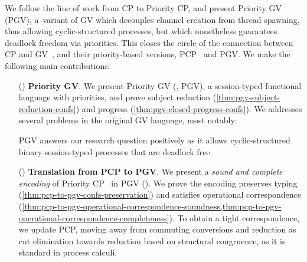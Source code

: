 \documentclass[main.tex]{subfiles}
\begin{document}
We follow the line of work from CP to Priority CP, and present Priority GV (PGV), a~variant of GV which decouples channel creation from thread spawning, thus allowing cyclic-structured processes, but which nonetheless guarantees deadlock freedom via priorities. This closes the circle of the connection between CP and GV~\cite{wadler14}, and their priority-based versions, PCP~\cite{dardhagay18extended} and PGV.
We make the following main contributions:
\begin{enumerate}[labelindent=0pt,labelwidth=1.333\parindent,align=left,labelsep*=0pt,leftmargin=!]
\item[(\secref{sec:pgv})] \textbf{Priority GV}. We present Priority GV (, PGV), a session-typed functional language with priorities, and prove subject reduction (\cref{thm:pgv-subject-reduction-confs}) and progress (\cref{thm:pgv-closed-progress-confs}). We addresses several problems in the original GV language, most notably:
  PGV answers our research question positively as it allows cyclic-structured binary session-typed processes that are deadlock free.
\item[(\secref{sec:pcp})] \textbf{Translation from PCP to PGV}.
  We present a \emph{sound and complete encoding} of Priority CP~\cite{dardhagay18extended} in PGV (). We prove the encoding preserves typing (\cref{thm:pcp-to-pgv-confs-preservation}) and satisfies operational correspondence (\cref{thm:pcp-to-pgv-operational-correspondence-soundness,thm:pcp-to-pgv-operational-correspondence-completeness}).
  To obtain a tight correspondence, we update PCP, moving away from commuting conversions and reduction as cut elimination towards reduction based on structural congruence, as it is standard in process calculi.
\end{enumerate}
\end{document}
